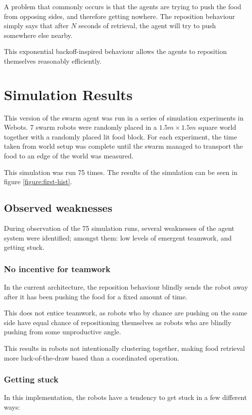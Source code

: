 \documentclass[a4paper]{article}
\begin{document}
A problem that commonly occurs is that the agents are trying to push the food from opposing sides, and therefore getting nowhere.
The reposition behaviour simply says that after $ N $ seconds of retrieval, the agent will try to push somewhere else nearby.

This exponential backoff-inspired behaviour allows the agents to reposition themselves reasonably efficiently.

\section{Simulation Results}
\label{section:first-sim-results}

This version of the swarm agent was run in a series of simulation experiments in Webots.
7 swarm robots were randomly placed in a $ 1.5m \times 1.5m $ square world together with a randomly placed lit food block.
For each experiment, the time taken from world setup was complete until the swarm managed to transport the food to an edge of the world was measured.

This simulation was run 75 times.
The results of the simulation can be seen in figure \vref{figure:first-hist}.

\subsection{Observed weaknesses}

During observation of the 75 simulation runs, several weaknesses of the agent system were identified; amongst them: low levels of emergent teamwork, and getting stuck.

\subsubsection{No incentive for teamwork}
In the current architecture, the reposition behaviour blindly sends the robot away after it has been pushing the food for a fixed amount of time.

This does not entice teamwork, as robots who by chance are pushing on the same side have equal chance of repositioning themselves as robots who are blindly pushing from some unproductive angle.

This results in robots not intentionally clustering together, making food retrieval more luck-of-the-draw based than a coordinated operation.

\subsubsection{Getting stuck}
In this implementation, the robots have a tendency to get stuck in a few different ways:
\end{document}
